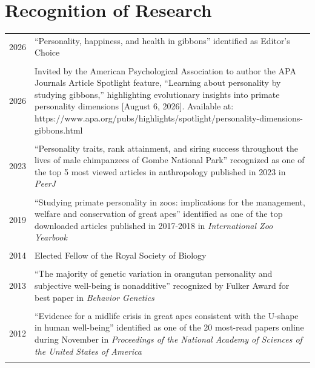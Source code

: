 \documentclass[11pt]{article}
\begin{document}
\section*{Recognition of Research}
\begin{tabular}{p{3cm}p{12cm}}
  2026 & ``Personality, happiness, and health in gibbons'' identified
         as Editor's Choice \\ \\

  2026 & Invited by the American Psychological Association to author the
         APA Journals Article Spotlight feature, ``Learning about personality 
         by studying gibbons,'' highlighting evolutionary insights into 
         primate personality dimensions [August 6, 2026]. Available at: 
         https://www.apa.org/pubs/highlights/spotlight/personality-dimensions-gibbons.html \\ \\
  
  2023 & ``Personality traits, rank attainment, and siring success
         throughout the lives of male chimpanzees of Gombe National
         Park'' recognized as one of the top 5 most viewed articles in
         anthropology published in 2023 in \textit{PeerJ} \\ \\

  2019 &  ``Studying primate personality in zoos: implications for the
         management, welfare and conservation of great apes'' identified as one
         of the top downloaded articles published in 2017-2018 in
         \textit{International Zoo Yearbook} \\ \\

  2014 & Elected Fellow of the Royal Society of Biology \\ \\

  2013 & ``The majority of genetic variation in orangutan
         personality and subjective well-being is nonadditive'' recognized by 
         Fulker Award for best paper in \textit{Behavior Genetics} \\ \\

  2012 & ``Evidence for a midlife crisis in great apes consistent with
         the U-shape in human well-being'' identified as one of the 20
         most-read papers online during November in
         \textit{Proceedings of the National Academy of Sciences of
         the United States of America} \\ \\ 


\end{tabular}
\end{document}
